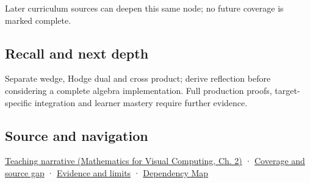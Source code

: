 Later curriculum sources can deepen this same node; no future coverage is marked complete.

\subsection{Recall and next depth}\label{appendix-e1960925d1b8-recall-and-next-depth}

Separate wedge, Hodge dual and cross product; derive reflection before considering a complete algebra implementation. Full production proofs, target-specific integration and learner mastery require further evidence.

\subsection{Source and navigation}\label{appendix-e1960925d1b8-source-and-navigation}

\href{../02-Mathematics-for-Visual-Computing/main.pdf\#nameddest=01-foundations-i-ch018-oriented-areas-deserve-their-own-representation}{Teaching narrative (Mathematics for Visual Computing, Ch. 2)} · \hyperref[appendix-fd090d982a15-phase-6---parts-501-600]{Coverage and source gap} · \hyperref[appendix-a103e7846d21-phase-6---source-analysis-and-verification]{Evidence and limits} · \hyperref[appendix-4ad47bdd269a]{Dependency Map}

